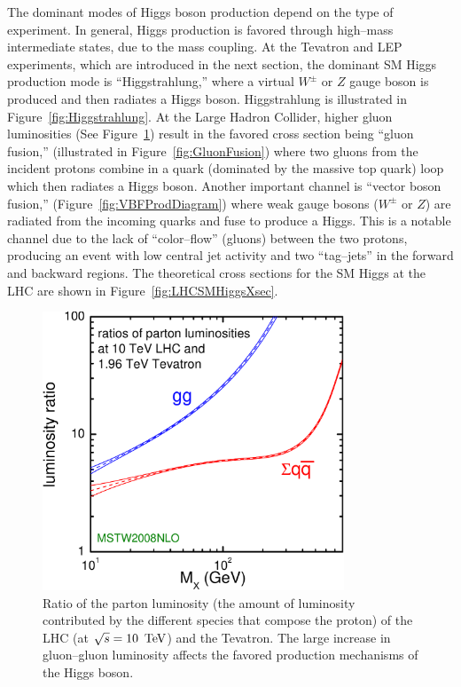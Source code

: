 The dominant modes of Higgs boson production depend on the type of experiment.
In general, Higgs production is favored through high--mass intermediate states,
due to the mass coupling.  At the Tevatron and LEP experiments, which are
introduced in the next section, the dominant SM Higgs production mode is
``Higgstrahlung,'' where a virtual $W^\pm$ or $Z$ gauge boson is produced and
then radiates a Higgs boson.  Higgstrahlung is illustrated in
Figure~\ref{fig:Higgstrahlung}.  At the Large Hadron Collider, higher gluon
luminosities (See Figure~\ref{fig:GluonLumiRatio}) result in the favored cross
section being ``gluon fusion,'' (illustrated in Figure~\ref{fig:GluonFusion})
where two gluons from the incident protons combine in a quark (dominated by the
massive top quark) loop which then radiates a Higgs boson.  Another important
channel is ``vector boson fusion,'' (Figure~\ref{fig:VBFProdDiagram}) where weak
gauge bosons ($W^\pm$ or $Z$) are radiated from the incoming quarks and fuse to
produce a Higgs.  This is a notable channel due to the lack of ``color--flow''
(gluons) between the two protons, producing an event with low central jet
activity and two ``tag--jets'' in the forward and backward regions.  The
theoretical cross sections for the SM Higgs at the LHC are shown in
Figure~\ref{fig:LHCSMHiggsXsec}.
\begin{figure}
  \centering
  \includegraphics[width=90mm,angle=0]{theory_chapter/figures/parton_lumis_10TeV_vs_2TeV.pdf}
  \caption[Parton luminosity comparison of the LHC and Tevatron]{Ratio of the
  parton luminosity (the amount of luminosity contributed by the different
  species that compose the proton) of the LHC (at $\sqrt s = 10~\,\text{Te\hspace{-.08em}V}$) and the
  Tevatron.  The large increase in gluon--gluon luminosity affects the favored
  production mechanisms of the Higgs boson.  } \label{fig:GluonLumiRatio}
\end{figure}
